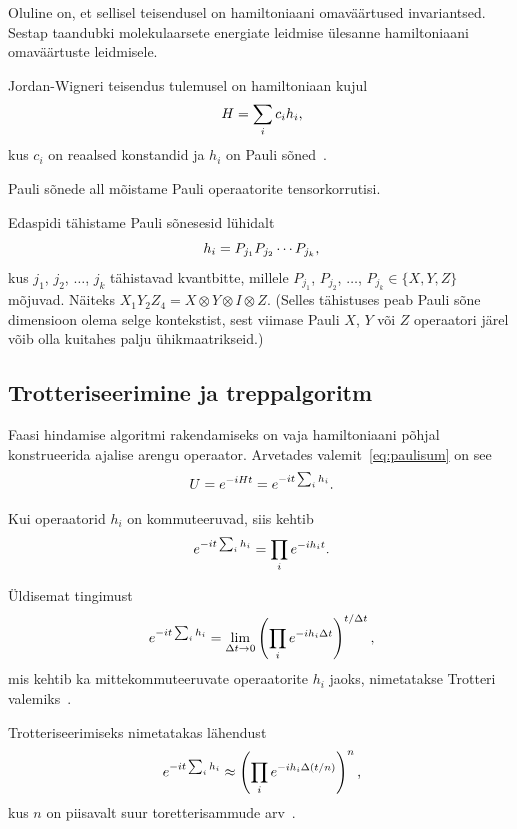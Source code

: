 \documentclass[12pt]{report}
\def\paren#1{\left(#1\right)}
\begin{document}
Oluline on, et sellisel teisendusel on hamiltoniaani omaväärtused invariantsed.
Sestap taandubki molekulaarsete energiate leidmise ülesanne hamiltoniaani omaväärtuste leidmisele.

Jordan-Wigneri teisendus tulemusel on hamiltoniaan kujul
\begin{align}\label{eq:paulisum}
    H = \sum_i c_i h_i \rlap{,}
\end{align}
kus \(c_i\) on reaalsed konstandid ja \(h_i\) on Pauli sõned~\cite{whitfield+etal}.

Pauli sõnede all mõistame Pauli operaatorite tensorkorrutisi.

Edaspidi tähistame Pauli sõnesesid lühidalt
\begin{equation} h_i=P_{j_1}P_{j_2}\cdots P_{j_k} \rlap{,}\end{equation}
kus \(j_1\), \(j_2\), $\ldots$, \(j_k\) tähistavad kvantbitte, millele \(P_{j_1}\), \(P_{j_2}\), \(\ldots\), \(P_{j_k}\in\{X,Y,Z\}\) mõjuvad.
Näiteks \(X_1Y_2Z_4=X\otimes Y\otimes I\otimes Z.\)
(Selles tähistuses peab Pauli sõne dimensioon olema selge kontekstist, sest viimase Pauli \(X\), \(Y\) või \(Z\) operaatori järel võib olla kuitahes palju ühikmaatrikseid.)

\subsection{Trotteriseerimine ja treppalgoritm}\label{sec:qcirc}

Faasi hindamise algoritmi rakendamiseks on vaja hamiltoniaani põhjal konstrueerida ajalise arengu operaator.
Arvetades valemit~\eqref{eq:paulisum} on see
\begin{align}
    U = e^{-iHt} = e^{-it\sum_i h_i} \rlap{.}
\end{align}

Kui operaatorid \(h_i\) on kommuteeruvad, siis kehtib
\begin{align}
    e^{-it\sum_i h_i} = \prod_i e^{-i h_i t} \rlap{.}
\end{align}

Üldisemat tingimust
\begin{align}
    e^{-it\sum_i h_i}
    = \lim_{\Delta t \rightarrow 0} \paren{\prod_i e^{-i h_i \Delta t}}^{t / \Delta t} \rlap{,}
\end{align}
mis kehtib ka mittekommuteeruvate operaatorite \(h_i\) jaoks, nimetatakse Trotteri valemiks~\cite{whitfield+etal}.

Trotteriseerimiseks nimetatakas lähendust
\begin{align}\label{eq:trot}
    e^{-it\sum_i h_i}
    \approx \paren{\prod_i e^{-i h_i \Delta (t / n)}}^n \rlap{,}
\end{align}
kus \(n\) on piisavalt suur toretterisammude arv~\cite{whitfield+etal, nielsen+chuang}.
\end{document}
